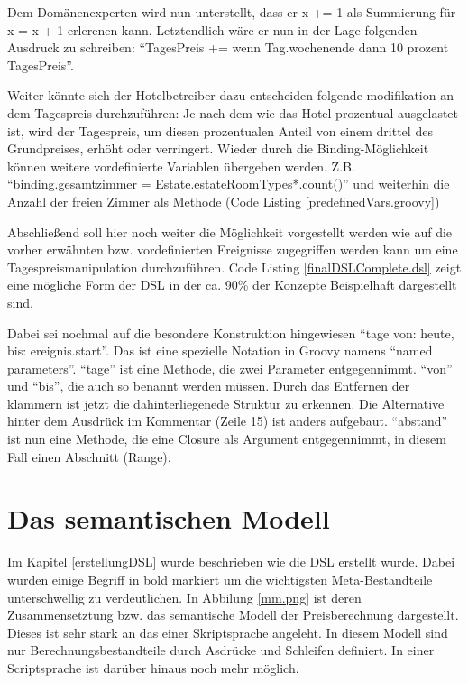 \documentclass[11pt,english,ngerman, headsepline]{scrreprt}
\begin{document}

 
Dem Domänenexperten wird nun unterstellt, dass er x += 1 als Summierung für x =
x + 1 erlerenen kann. Letztendlich wäre er nun in der Lage folgenden Ausdruck zu
schreiben: ``TagesPreis += wenn Tag.wochenende dann 10 prozent TagesPreis''.
 
Weiter könnte sich der Hotelbetreiber dazu entscheiden folgende modifikation an
dem Tagespreis durchzuführen: Je nach dem wie das Hotel prozentual ausgelastet
ist, wird der Tagespreis, um diesen prozentualen Anteil von einem drittel des
Grundpreises, erhöht oder verringert.
Wieder durch die Binding-Möglichkeit können weitere vordefinierte Variablen
übergeben werden. Z.B. ``binding.gesamtzimmer =
Estate.estateRoomTypes*.count()'' und weiterhin die Anzahl der freien
Zimmer als Methode (Code Listing \ref{predefinedVars.groovy}) 


 
Abschließend soll hier noch weiter die Möglichkeit vorgestellt werden wie auf
die vorher erwähnten bzw. vordefinierten Ereignisse zugegriffen werden kann um
eine Tagespreismanipulation durchzuführen.
Code Listing \ref{finalDSLComplete.dsl} zeigt eine mögliche Form der DSL in der ca. 90\% der
Konzepte Beispielhaft dargestellt sind.  



Dabei sei nochmal auf die besondere Konstruktion hingewiesen ``tage von: heute,
bis: ereignis.start''. Das ist eine spezielle Notation in Groovy namens
``named parameters''. ``tage'' ist eine Methode, die zwei Parameter entgegennimmt.
``von'' und ``bis'', die auch so benannt werden müssen. Durch das Entfernen der
klammern ist jetzt die dahinterliegenede Struktur zu erkennen. Die Alternative hinter dem Ausdrück im
Kommentar (Zeile 15) ist anders aufgebaut. ``abstand'' ist nun eine Methode, die
eine Closure als Argument entgegennimmt, in diesem Fall einen Abschnitt
(Range).

\section{Das semantischen Modell}

Im Kapitel \ref{erstellungDSL} wurde beschrieben wie die DSL erstellt wurde.
Dabei wurden einige Begriff in bold markiert um die wichtigsten
Meta-Bestandteile unterschwellig zu verdeutlichen. In Abbilung \ref{mm.png}
ist deren Zusammensetztung bzw. das semantische Modell der Preisberechnung
dargestellt.
Dieses ist sehr stark an das einer Skriptsprache angeleht.
In diesem Modell sind nur Berechnungsbestandteile durch Asdrücke und Schleifen
definiert. In einer Scriptsprache ist darüber hinaus noch mehr möglich.
\end{document}
